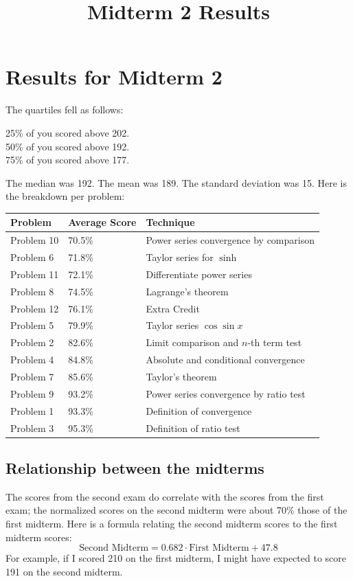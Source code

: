 \documentclass[12pt]{article}
\title{Midterm 2 Results}
\begin{document}
\section*{Results for Midterm 2}

The quartiles fell as follows:
\begin{center}
25\% of you scored above 202. \\
50\% of you scored above 192. \\
75\% of you scored above 177.
\end{center}
The median was 192.  The mean was 189.  The standard deviation was 15.
Here is the breakdown per problem:
\begin{center}
\begin{tabular}{lll}
\textbf{Problem} & \textbf{Average Score} & \textbf{Technique} \\
\hline
Problem 10 & 70.5\% & Power series convergence by comparison \\
Problem 6  & 71.8\% & Taylor series for $\sinh$ \\
Problem 11 & 72.1\% & Differentiate power series \\
Problem 8  & 74.5\% & Lagrange's theorem \\
Problem 12 & 76.1\% & Extra Credit \\
Problem 5  & 79.9\% & Taylor series $\cos \sin x$\\
Problem 2  & 82.6\% & Limit comparison and $n$-th term test \\
Problem 4  & 84.8\% & Absolute and conditional convergence \\
Problem 7  & 85.6\% & Taylor's theorem \\
Problem 9  & 93.2\% & Power series convergence by ratio test \\
Problem 1  & 93.3\% & Definition of convergence\\
Problem 3  & 95.3\% & Definition of ratio test
\end{tabular}
\end{center}

\subsection*{Relationship between the midterms}

The scores from the second exam do correlate with the scores from the
first exam; the normalized scores on the second midterm were about
70\% those of the first midterm.  Here is a formula relating the
second midterm scores to the first midterm scores:
$$
\mbox{Second  Midterm} = 0.682 \cdot \mbox{First Midterm} + 47.8
$$
For example, if I scored 210 on the first midterm, I might have
expected to score 191 on the second midterm.
\end{document}
